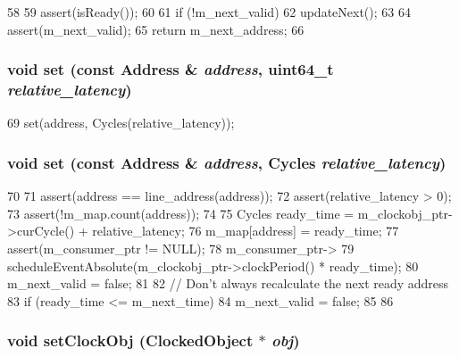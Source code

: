 \begin{DoxyCode}
58 {
59     assert(isReady());
60 
61     if (!m_next_valid) {
62         updateNext();
63     }
64     assert(m_next_valid);
65     return m_next_address;
66 }
\end{DoxyCode}
\hypertarget{classTimerTable_ada47cc37e5c46401dbac71cf3972a211}{
\subsubsection[{set}]{\setlength{\rightskip}{0pt plus 5cm}void set (const {\bf Address} \& {\em address}, \/  uint64\_\-t {\em relative\_\-latency})}}
\label{classTimerTable_ada47cc37e5c46401dbac71cf3972a211}



\begin{DoxyCode}
69     { set(address, Cycles(relative_latency)); }
\end{DoxyCode}
\hypertarget{classTimerTable_a7e2c839d59092594ac3fd757ae2f617c}{
\subsubsection[{set}]{\setlength{\rightskip}{0pt plus 5cm}void set (const {\bf Address} \& {\em address}, \/  {\bf Cycles} {\em relative\_\-latency})}}
\label{classTimerTable_a7e2c839d59092594ac3fd757ae2f617c}



\begin{DoxyCode}
70 {
71     assert(address == line_address(address));
72     assert(relative_latency > 0);
73     assert(!m_map.count(address));
74 
75     Cycles ready_time = m_clockobj_ptr->curCycle() + relative_latency;
76     m_map[address] = ready_time;
77     assert(m_consumer_ptr != NULL);
78     m_consumer_ptr->
79         scheduleEventAbsolute(m_clockobj_ptr->clockPeriod() * ready_time);
80     m_next_valid = false;
81 
82     // Don't always recalculate the next ready address
83     if (ready_time <= m_next_time) {
84         m_next_valid = false;
85     }
86 }
\end{DoxyCode}
\hypertarget{classTimerTable_abc72aeeb43ac97f6a2e2a003f050bb06}{
\subsubsection[{setClockObj}]{\setlength{\rightskip}{0pt plus 5cm}void setClockObj ({\bf ClockedObject} $\ast$ {\em obj})}}
\label{classTimerTable_abc72aeeb43ac97f6a2e2a003f050bb06}



